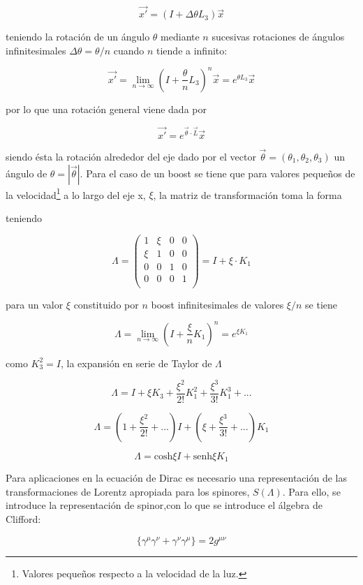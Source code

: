 $$ \vec{x'} = (I + \Delta\theta L_3)\vec{x} $$

teniendo la rotación de un ángulo $\theta$ mediante $n$ sucesivas rotaciones de ángulos infinitesimales $\Delta\theta = \theta/n$ cuando $n$ tiende a infinito:

$$ \vec{x'} = \lim_{n \to \infty} \left( I + \frac{\theta}{n}L_3 \right)^n \vec{x} = e^{\theta L_3}\vec{x} $$

por lo que una rotación general viene dada por

$$ \vec{x'} = e^{\vec{\theta}\cdot \vec{L}}\vec{x} $$

siendo ésta la rotación alrededor del eje dado por el vector $\vec{\theta} = (\theta_1, \theta_2, \theta_3)$ un ángulo de $\theta = |\vec{\theta}|$. Para el caso de un boost se tiene que para valores pequeños de la velocidad\footnote{Valores pequeños respecto a la velocidad de la luz.} a lo largo del eje x, $\xi$, la matriz de transformación toma la forma

teniendo

$$ \Lambda = \begin{pmatrix}
    1 & \xi & 0 & 0 \\
    \xi & 1 & 0 & 0 \\
    0 & 0 & 1 & 0 \\
    0 & 0 & 0 & 1 \\
\end{pmatrix} = I + \xi\cdot K_1$$

para un valor $\xi$ constituido por $n$ boost infinitesimales de valores $\xi/n$ se tiene

$$ \Lambda = \lim_{n \to \infty} \left( I + \frac{\xi}{n}K_1 \right)^n = e^{\xi K_1} $$

como $K_3^2 = I$, la expansión en serie de Taylor de $\Lambda$

$$ \Lambda = I + \xi K_3 + \frac{\xi^2}{2!}K_1^2 + \frac{\xi^3}{3!}K_1^3 + ... $$

$$ \Lambda = \left( 1 + \frac{\xi^2}{2!} + ... \right)I + \left( \xi + \frac{\xi^3}{3!} + ... \right)K_1 $$

$$ \Lambda = \text{cosh}\xi I + \text{senh}\xi K_1 $$

Para aplicaciones en la ecuación de Dirac es necesario una representación de las transformaciones de Lorentz apropiada para los spinores, $S(\Lambda)$. Para ello, se introduce la representación de spinor,con lo que se introduce el álgebra de Clifford:

$$ \{ \gamma^{\mu}\gamma^{\nu} + \gamma^{\nu}\gamma^{\mu} \} = 2g^{\mu\nu} $$

